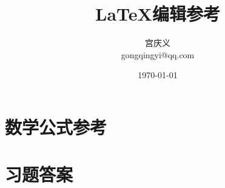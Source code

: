 


\begin{titlepage}
    \title{\LaTeX{}编辑参考}
    \author{宫庆义\\gongqingyi@qq.com} 
    \date{\today}
\end{titlepage}

 
\frontmatter  
\pagestyle{empty}
\maketitle                         %
\setcounter{page}{1}        %
\tableofcontents               %
\pagestyle{fancy}
\mainmatter                         %
 


\appendix 
\titleformat{\chapter}{\centering\Huge\bfseries}{\chaptername}{1em}{}
\renewcommand{\chaptername}{附录~\thechapter~}
\chapter{数学公式参考}
\chapter{习题答案}


